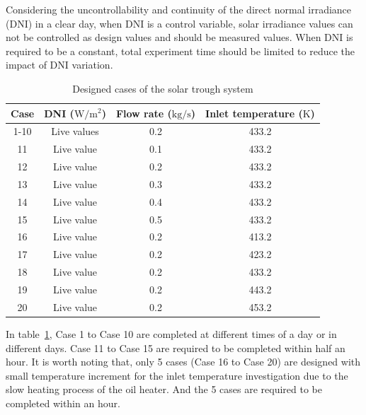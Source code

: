 
Considering the uncontrollability and continuity of the direct normal irradiance (DNI) in a clear day, when DNI is a control variable, solar irradiance values can not be controlled as design values and should be measured values. When DNI is required to be a constant, total experiment time should be limited to reduce the impact of DNI variation.

\begin{table}[htbp]\footnotesize
	\caption{Designed cases of the solar trough system}
	\begin{center}
	\begin{tabular}{cccc}
		\toprule
		Case	& DNI ($\mathrm{W/m^2}$)	&	Flow rate ($\mathrm{kg/s}$)			&	Inlet temperature ($\mathrm{K}$)\\
		\midrule
		1-10	&	Live values	&	0.2	&	433.2\\
		11	&	Live value	&	0.1	&	433.2\\
		12	&	Live value	&	0.2	&	433.2\\
		13	&	Live value	&	0.3	&	433.2\\
		14	&	Live value	&	0.4	&	433.2\\
		15	&	Live value	&	0.5	&	433.2\\
		16	&	Live value	&	0.2	&	413.2\\
		17	&	Live value	&	0.2	&	423.2\\
		18	&	Live value	&	0.2	&	433.2\\
		19	&	Live value	&	0.2	&	443.2\\
		20	&	Live value	&	0.2	&	453.2\\
		\bottomrule
	\end{tabular}
	\end{center}
	\label{tab:DesignedCasesForTrough}
\end{table}

In table~\ref{tab:DesignedCasesForTrough}, Case 1 to Case 10 are completed at different times of a day or in different days. Case 11 to Case 15 are required to be completed within half an hour. It is worth noting that, only 5 cases (Case 16 to Case 20) are designed with small temperature increment for the inlet temperature investigation due to the slow heating process of the oil heater. And the 5 cases are required to be completed within an hour.

